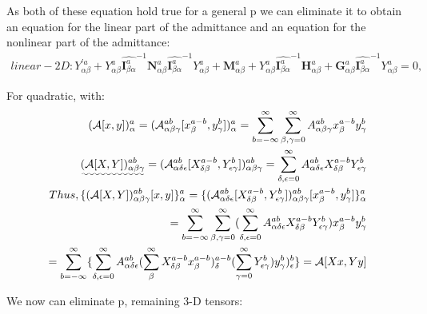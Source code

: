 \documentclass{Note}
\begin{document}
As both of these equation hold true for a general p we can eliminate it to obtain an equation for the linear part of the admittance and an equation for the nonlinear part of the admittance:
  \begin{equation}
\begin{aligned}
linear-2D:{Y}_{\alpha\beta}^{'a} +Y_{\alpha\beta}^{a} {\widehat{\textbf{I}_{\beta \alpha}^a}}^{-1}   \textbf{N}_{\alpha\beta}^a {\widehat{\textbf{I}_{\beta \alpha}^a}}^{-1}  Y_{\alpha\beta}^a +\textbf{M}_{\alpha\beta}^a +Y_{\alpha\beta}^{a} {\widehat{\textbf{I}_{\beta \alpha}^a}}^{-1}  \textbf{H}_{\alpha\beta}^a + \textbf{G}_{\alpha\beta}^a  {\widehat{\textbf{I}_{\beta \alpha}^a}}^{-1}  Y_{\alpha\beta}^a =0,
\end{aligned}
\end{equation}
 

For quadratic, with:
  \begin{equation}
\begin{aligned}
(\mathcal{A}[x,y])_{\alpha}^a=(\mathcal{A}_{\alpha\beta\gamma}^{ab}[x_{\beta}^{a-b},y_{\gamma}^b])_{\alpha}^a=\sum_{b=-\infty}^{\infty}\sum_{\beta,\gamma=0}^{\infty}A_{\alpha\beta\gamma}^{ab}x_{\beta}^{a-b}y_{\gamma}^b\\
\uwave{(\mathcal{A}[X,Y])_{\alpha\beta\gamma}^{ab}}=(\mathcal{A}_{\alpha\delta\epsilon}^{ab}[X_{\delta\beta}^{a-b},Y_{\epsilon\gamma}^b])_{\alpha\beta\gamma}^{ab}=\sum_{\delta,\epsilon=0}^{\infty}A_{\alpha\delta\epsilon}^{ab}X_{\delta\beta}^{a-b}Y_{\epsilon\gamma}^b\\
Thus,
\{(\mathcal{A}[X,Y])_{\alpha\beta\gamma}^{ab}[x,y]\}_{\alpha}^a=\{(\mathcal{A}_{\alpha\delta\epsilon}^{ab}[X_{\delta\beta}^{a-b},Y_{\epsilon\gamma}^b])_{\alpha\beta\gamma}^{ab}[x_{\beta}^{a-b},y_{\gamma}^b]\}_{\alpha}^a
\\
=\sum_{b=-\infty}^{\infty}\sum_{\beta,\gamma=0}^{\infty}(\sum_{\delta,\epsilon=0}^{\infty}A_{\alpha\delta\epsilon}^{ab}X_{\delta\beta}^{a-b}Y_{\epsilon\gamma}^b)x_{\beta}^{a-b}y_{\gamma}^b
\\
=\sum_{b=-\infty}^{\infty}\{\sum_{\delta,\epsilon=0}^{\infty}A_{\alpha\delta\epsilon}^{ab} (\sum_{\beta}^{\infty}X_{\delta\beta}^{a-b}x_{\beta}^{a-b})_{\delta}^{a-b}( \sum_{\gamma=0}^{\infty} Y_{\epsilon\gamma}^b)y_{\gamma}^b)_{\epsilon}^{b}\}
=\mathcal{A}[Xx,Yy]
\end{aligned}
\end{equation}

We now can eliminate p, remaining 3-D tensors:
\end{document}
